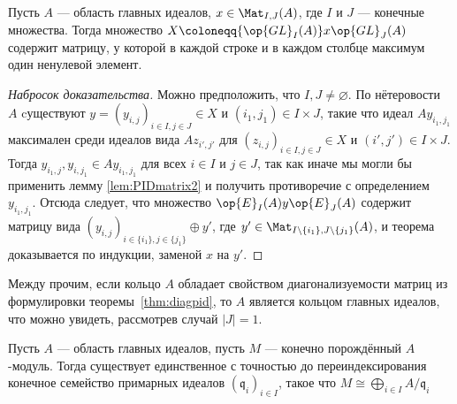 \documentclass[
	extrafontsizes,
	11pt,
	hyphens,
]{memoir}
\begin{document}
\begin{theorem}
\label{thm:diagpid}
Пусть \(A\) --- область главных идеалов,
\(x \in \Mat_{I,J}(A)\), где \(I\) и \(J\) --- конечные множества. Тогда множество
\(X \coloneqq {\op{GL}_I(A)} x {\op{GL}_J(A)}\)
содержит матрицу, у которой в каждой строке и в каждом столбце максимум один ненулевой элемент.
\end{theorem}

\begin{proof}[Набросок доказательства]
Можно предположить, что \(I,J \neq \varnothing\).
По нётеровости \(A\) cуществуют \(y = (y_{i,j})_{i \in I, j \in J} \in X\) и \((i_1,j_1) \in I \times J\), такие что идеал \(Ay_{i_1,j_1}\) максимален среди идеалов вида \(Az_{i',j'}\) для \((z_{i,j})_{i \in I, j \in J} \in X\) и \((i',j') \in I \times J\).
Тогда \(y_{i_1,j}, y_{i,j_1} \in A y_{i_1,j_1}\) для всех \(i \in I\) и \(j \in J\), так как иначе мы могли бы применить лемму \ref{lem:PIDmatrix2} и получить противоречие с определением \(y_{i_1,j_1}\).
Отсюда следует, что множество \(\op{E}_I(A)y\op{E}_J(A)\)
содержит матрицу вида \((y_{i,j})_{i \in \{i_1\}, j \in \{j_1\}} \oplus y'\), где \(y' \in \Mat_{I \setminus \{i_1\},J \setminus \{j_1\}}(A)\), и
теорема доказывается по индукции, заменой \(x\) на \(y'\).
\end{proof}

\begin{remark}
Между прочим, если кольцо \(A\) обладает свойством диагонализуемости матриц из формулировки теоремы~\ref{thm:diagpid}, то \(A\) является кольцом главных идеалов, что можно увидеть, рассмотрев случай \(\lvert J \rvert = 1\).
\end{remark}

\begin{theorem}
Пусть \(A\) --- область главных идеалов, пусть \(M\) --- конечно порождённый \(A\)-модуль. Тогда существует единственное с точностью до переиндексирования конечное семейство примарных идеалов \((\mathfrak{q}_i)_{i \in I}\), такое что \(M \cong \bigoplus_{i \in I} A / \mathfrak{q}_i\)
\end{theorem}
\end{document}

